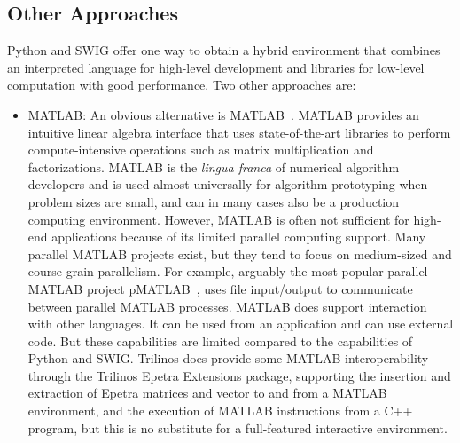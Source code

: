 \documentclass[acmtocl]{acmtrans2m}
\begin{document}
\subsection{Other Approaches}

Python and SWIG offer one way to obtain a hybrid environment that
combines an interpreted language for high-level development and
libraries for low-level computation with good performance.  Two other
approaches are:

\begin{itemize}

\item MATLAB: An obvious alternative is
  MATLAB~\cite{Matlab-home-page}.  MATLAB provides an intuitive linear
  algebra interface that uses state-of-the-art libraries to perform
  compute-intensive operations such as matrix multiplication and
  factorizations.  MATLAB is the {\it lingua franca} of numerical
  algorithm developers and is used almost universally for algorithm
  prototyping when problem sizes are small, and can in many cases also
  be a production computing environment.  However, MATLAB is often not
  sufficient for high-end applications because of its limited parallel
  computing support.  Many parallel MATLAB projects exist, but they tend
  to focus on medium-sized and course-grain parallelism.  For example, arguably
  the most popular parallel MATLAB project pMATLAB~\cite{pMatlab-home-page},
  uses file input/output to communicate between parallel MATLAB processes.
  MATLAB does support interaction with other
  languages.  It can be used from an application and can use external
  code.  But these capabilities are limited compared to the
  capabilities of Python and SWIG.  Trilinos does provide some MATLAB
  interoperability through the Trilinos Epetra Extensions package,
  supporting the insertion and extraction of Epetra matrices and
  vector to and from a MATLAB environment, and the execution of MATLAB
  instructions from a C++ program, but this is no substitute for a
  full-featured interactive environment.


\end{itemize}
\end{document}
